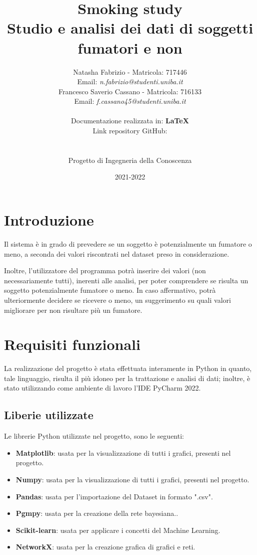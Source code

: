 \documentclass{article}
\title{\textbf{Smoking study} \\
    \large Studio e analisi dei dati di soggetti fumatori e non}\\\\
\author{Natasha Fabrizio - Matricola: 717446 \\
Email: \textit{n.fabrizio@studenti.uniba.it} \\
    Francesco Saverio Cassano - Matricola: 716133 \\
Email: \textit{f.cassano45@studenti.uniba.it} \\\\
Documentazione realizzata in: \textbf{LaTeX} \\
Link repository GitHub:\\ \hrefs{https://github.com/nat-asha117/progettoICON} \\\\
    Progetto di Ingegneria della Conoscenza}
\date{2021-2022}
\begin{document}
    \maketitle

    \newpage

    \tableofcontents{}

    \newpage

\section{Introduzione}

Il sistema è in grado di prevedere se un soggetto è potenzialmente un fumatore o meno, a seconda dei valori riscontrati nel dataset preso in considerazione. 
%

\noindent
Inoltre, l'utilizzatore del programma potrà inserire dei valori (non necessariamente tutti), inerenti alle analisi, per poter comprendere se risulta un soggetto potenzialmente fumatore o meno. In caso affermativo, potrà ulteriormente decidere se ricevere o meno, un suggerimento su quali valori migliorare per non risultare più un fumatore.

\section{Requisiti funzionali}

La realizzazione del progetto è stata effettuata interamente in Python in quanto, tale linguaggio, risulta il più idoneo per la trattazione e analisi di dati; inoltre, è stato utilizzando come ambiente di lavoro l'IDE PyCharm 2022.

\subsection{Liberie utilizzate}
Le librerie Python utilizzate nel progetto, sono le seguenti:
\begin{itemize}
    \item \textbf{Matplotlib}: usata per la visualizzazione di tutti i grafici, presenti nel progetto.
    \item \textbf{Numpy}: usata per la visualizzazione di tutti i grafici, presenti nel progetto.
    \item \textbf{Pandas}: usata per l’importazione del  Dataset in formato ".csv".
    \item \textbf{Pgmpy}: usata per la creazione della rete bayesiana..
    \item\textbf{Scikit-learn}: usata per applicare i concetti del Machine Learning.
    \item \textbf{NetworkX}: usata per la creazione grafica di grafici e reti.
\end{itemize} 
\end{document}
